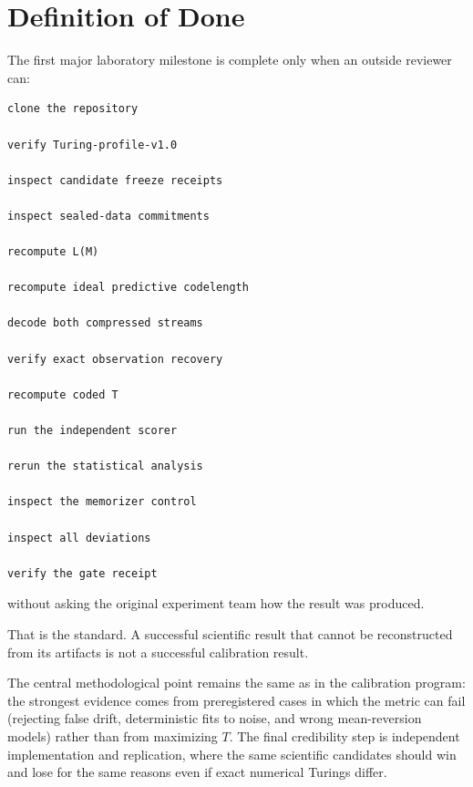 \documentclass[11pt]{article}
\begin{document}
\part{Definition of Done}

The first major laboratory milestone is complete only when an outside reviewer can:
\begin{verbatim}
clone the repository

verify Turing-profile-v1.0

inspect candidate freeze receipts

inspect sealed-data commitments

recompute L(M)

recompute ideal predictive codelength

decode both compressed streams

verify exact observation recovery

recompute coded T

run the independent scorer

rerun the statistical analysis

inspect the memorizer control

inspect all deviations

verify the gate receipt
\end{verbatim}
without asking the original experiment team how the result was produced.

That is the standard. A successful scientific result that cannot be reconstructed from its artifacts is not a successful calibration result.

The central methodological point remains the same as in the calibration program: the strongest evidence comes from preregistered cases in which the metric can fail (rejecting false drift, deterministic fits to noise, and wrong mean-reversion models) rather than from maximizing \(T\). The final credibility step is independent implementation and replication, where the same scientific candidates should win and lose for the same reasons even if exact numerical Turings differ.
\end{document}

